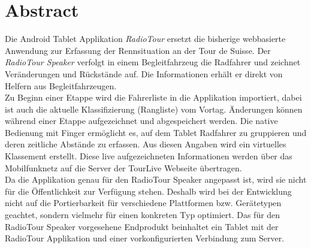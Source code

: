 \chapter*{Abstract}

Die Android Tablet Applikation \textit{RadioTour} ersetzt die bisherige webbasierte Anwendung zur Erfassung der Rennsituation an der Tour de Suisse. Der \textit{RadioTour Speaker} verfolgt in einem Begleitfahrzeug die Radfahrer und zeichnet Veränderungen und Rückstände auf. Die Informationen erhält er direkt von Helfern aus Begleitfahrzeugen.
\\
Zu Beginn einer Etappe wird die Fahrerliste in die Applikation importiert, dabei ist auch die aktuelle Klassifizierung (Rangliste) vom Vortag. Änderungen können während einer Etappe aufgezeichnet und abgespeichert werden. Die native Bedienung mit Finger ermöglicht es, auf dem Tablet Radfahrer zu gruppieren und deren zeitliche Abstände zu erfassen. Aus diesen Angaben wird ein virtuelles Klassement erstellt. Diese live aufgezeichneten Informationen werden über das Mobilfunknetz auf die Server der TourLive Webseite übertragen.
\\
Da die Applikation genau für den RadioTour Speaker angepasst ist, wird sie nicht für die Öffentlichkeit zur Verfügung stehen. Deshalb wird bei der Entwicklung nicht auf die Portierbarkeit für verschiedene Plattformen bzw. Gerätetypen geachtet, sondern vielmehr für einen konkreten Typ optimiert. Das für den RadioTour Speaker vorgesehene Endprodukt beinhaltet ein Tablet mit der RadioTour Applikation und einer vorkonfigurierten Verbindung zum Server.
